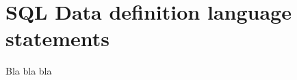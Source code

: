 %
%
%
%

\chapter{SQL Data definition language statements}

Bla bla bla

\begin{center}
	
\end{center}


